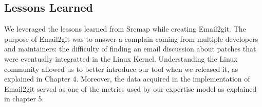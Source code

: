 \subsection{Lessons Learned}


We leveraged the lessons learned from Srcmap while creating Email2git. The purpose of Email2git was to answer a complain coming from multiple developers and maintainers: the difficulty of finding an email discussion about patches that were eventually integratted in the Linux Kernel. Understanding the Linux community allowed us to better introduce our tool when we released it, as explained in Chapter 4. Moreover, the data acquired in the implementation of Email2git served as one of the metrics used by our expertise model as explained in chapter 5.





